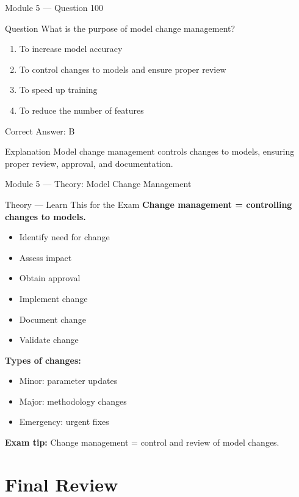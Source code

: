 \documentclass[aspectratio=169,10pt]{beamer}
\newcommand{\question}[1]{%
	\begin{block}{Question}
		#1
	\end{block}
}
\newcommand{\options}[4]{%
	\begin{enumerate}[label=\Alph*.,leftmargin=*]
		\item #1
		\item #2
		\item #3
		\item #4
	\end{enumerate}
}
\newcommand{\answerbox}[1]{%
	\begin{exampleblock}{Correct Answer: #1}
	\end{exampleblock}
}
\newcommand{\explain}[1]{%
	\begin{block}{Explanation}
		\small #1
	\end{block}
}
\newcommand{\theory}[1]{%
	\begin{block}{Theory --- Learn This for the Exam}
		\small #1
	\end{block}
}
\begin{document}
	\begin{frame}{Module 5 --- Question 100}
		\question{What is the purpose of model change management?}
		\options{To increase model accuracy}{To control changes to models and ensure proper review}{To speed up training}{To reduce the number of features}
		\answerbox{B}
		\explain{Model change management controls changes to models, ensuring proper review, approval, and documentation.}
	\end{frame}
	
	\begin{frame}{Module 5 --- Theory: Model Change Management}
		\theory{
			\textbf{Change management = controlling changes to models.}
			\begin{itemize}
				\item Identify need for change
				\item Assess impact
				\item Obtain approval
				\item Implement change
				\item Document change
				\item Validate change
			\end{itemize}
			\textbf{Types of changes:}
			\begin{itemize}
				\item Minor: parameter updates
				\item Major: methodology changes
				\item Emergency: urgent fixes
			\end{itemize}
			\textbf{Exam tip:} Change management = control and review of model changes.
		}
	\end{frame}
	
	\section{Final Review}
	
\end{document}
